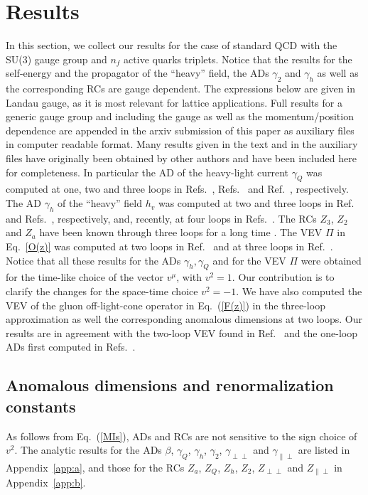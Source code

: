 \documentclass[12pt]{article}
\numberwithin{equation}{section}
\newcommand{\1}[1]{\mathbf{1}^{#1}}
\newcommand{\2}[1]{\mathbf{2}^{#1}}
\newcommand{\3}[1]{\mathbf{3}^{#1}}
\newcommand{\4}[1]{\mathbf{4}^{#1}}
\newcommand{\5}[1]{\mathbf{5}^{#1}}
\newcommand{\ice}[1]{{}}
\newcommand{\re}[1]{(\ref{#1})}
\newcommand{\ga}{\gamma}
\newcommand{\vv}{v^2}
\newcommand{\jj}{Q}
\newcommand{\TT}{{\perp\perp}}
\newcommand{\PT}{{\parallel\perp}}
\begin{document}
\section{Results}
\label{sec:five}
In this section, we collect our results for the case of standard QCD with the
SU(3) gauge group and $n_f$ active quarks triplets. 
Notice that the results for the self-energy and the propagator of the ``heavy'' field, 
the ADs $\ga_2$ and $\ga_h$ as well as the corresponding RCs are gauge dependent.
The expressions below are given in Landau gauge, as it is  most relevant  for
lattice applications.
Full results for a generic gauge group and including the
gauge as well as the momentum/position dependence are appended in the arxiv
submission of this paper as auxiliary
files in computer readable format.
Many results given in the text and in the auxiliary files have originally been
obtained by other authors and have been included here for completeness.
In particular the AD of the heavy-light current $\ga_\jj$ was computed at one, two and three loops in
Refs.~\cite{Politzer:1988wp,Shifman:1986sm}, Refs.~\cite{Ji:1991pr,Broadhurst:1991fz}
and Ref.~\cite{Chetyrkin:2003vi}, respectively.
The AD $\ga_h$ of the ``heavy''  field  $h_v$ was computed at two and
three loops in Ref.~\cite{Broadhurst:1991fz} and
Refs.~\cite{Melnikov:2000zc,Chetyrkin:2003vi}, respectively, and, recently, 
at four loops in Refs.~\cite{Marquard:2018rwx,Bruser:2019auj}.
The RCs $Z_3$, $Z_2$ and $Z_a$ have been known through three loops for a long
time \cite{Tarasov:1980au,Tarasov:2019rwk,Larin:1993tp}.
The VEV $\Pi$ in Eq.~\eqref{O(z)} was computed at two loops in Ref.~\cite{Broadhurst:1991fc} and at
three loops in Ref.~\cite{Czarnecki:2001rh}.
Notice that all these results for the ADs $\ga_h, \ga_{\jj}$ and for the VEV $\Pi$ were obtained for 
the time-like choice of the vector $v^\mu$, with $v^2 =1$. 
Our contribution is to clarify the changes for the space-time choice  $v^2 = - 1$. 
We have also computed the VEV of the gluon off-light-cone operator in Eq.~\re{F(z)} in the three-loop approximation
as well the corresponding  anomalous dimensions at two loops. Our results are in agreement
with the two-loop VEV found in Ref.~\cite{Eidemuller:1997bb} and the one-loop ADs first computed in Refs.~\cite{Dorn:1980hs,Dorn:1981wa}.  
\subsection{Anomalous dimensions and renormalization constants}
As follows from Eq.~\re{MIs}, ADs and RCs are not sensitive to the sign choice of
$\vv$. \ice{
 All the calculations performed here completely reproduce the
corresponding results listed in Ref.~\cite{Chetyrkin:2003vi}.
}
The analytic results for the ADs $\beta$, $\gamma_Q$, $\gamma_h$, $\gamma_2$,
$\ga_\TT$ and $\ga_\PT$
are listed in Appendix~\ref{app:a}, and those for the RCs
$Z_a$, $Z_Q$, $Z_h$, $Z_2$, $Z_\TT$ and $Z_\PT$ in Appendix~\ref{app:b}.
\end{document}

